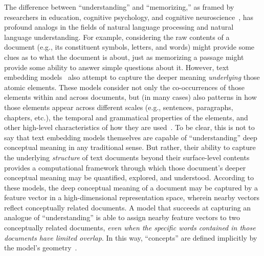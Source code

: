 \documentclass[10pt]{article}
\begin{document}
The difference between ``understanding'' and ``memorizing,'' as framed
by researchers in education, cognitive psychology, and cognitive
neuroscience~\citep[e.g.,][]{Kato40, Gall00, ScotEtal07, HallGree08,
  Macl05}, has profound analogs in the fields of natural language
processing and natural language understanding. For example,
considering the raw contents of a document (e.g., its constituent
symbols, letters, and words) might provide some clues as to what the
document is about, just as memorizing a passage might provide some
ability to answer simple questions about it. However, text embedding
models~\citep[e.g.,][]{LandDuma97, DeerEtal90, BleiEtal03,
  BleiLaff06, MikoEtal13a, CerEtal18, BrowEtal20, ViswEtal17} also
attempt to capture the deeper meaning \textit{underlying} those atomic
elements. These models consider not only the co-occurrences of those
elements within and across documents, but (in many cases) also
patterns in how those elements appear across different scales (e.g.,
sentences, paragraphs, chapters, etc.), the temporal and grammatical
properties of the elements, and other high-level characteristics of
how they are used~\citep{Mann20, Mann21a}.
To be clear, this is not to say that text embedding models themselves
are capable of ``understanding'' deep conceptual meaning in any
traditional sense. But rather, their ability to capture the underlying
\textit{structure} of text documents beyond their surface-level contents
provides a computational framework through which those document's
deeper conceptual meaning may be quantified, explored, and understood.
According to these models,
the deep conceptual meaning of a document may be captured by a feature
vector in a high-dimensional representation space, wherein nearby
vectors reflect conceptually related documents. A model that succeeds
at capturing an analogue of ``understanding'' is able to assign nearby
feature vectors to two conceptually related documents, \textit{even
  when the specific words contained in those documents have limited
  overlap}. In this way, ``concepts'' are defined implicitly by the
model's geometry~\citep[e.g., how the embedding coordinate of a given
word or document relates to the coordinates of other text
embeddings; ][]{PianHill22}.
\end{document}
